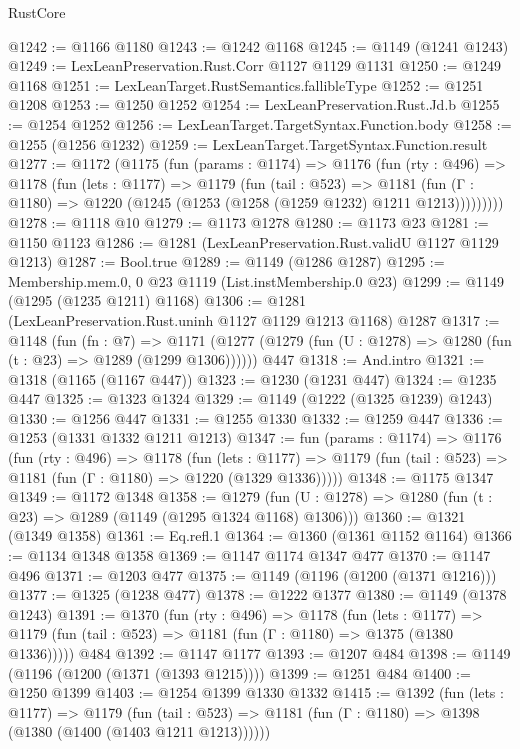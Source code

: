 \begin{lexlean}{RustCore}
\begin{coremodule}
@1242 := @1166 @1180
@1243 := @1242 @1168
@1245 := @1149 (@1241 @1243)
@1249 := LexLeanPreservation.Rust.Corr @1127 @1129 @1131
@1250 := @1249 @1168
@1251 := LexLeanTarget.RustSemantics.fallibleType
@1252 := @1251 @1208
@1253 := @1250 @1252
@1254 := LexLeanPreservation.Rust.Jd.b
@1255 := @1254 @1252
@1256 := LexLeanTarget.TargetSyntax.Function.body
@1258 := @1255 (@1256 @1232)
@1259 := LexLeanTarget.TargetSyntax.Function.result
@1277 := @1172
    (@1175
      (fun (params : @1174) =>
      @1176
        (fun (rty : @496) =>
        @1178
          (fun (lets : @1177) =>
          @1179
            (fun (tail : @523) =>
            @1181 (fun (Γ : @1180) => @1220 (@1245 (@1253 (@1258 (@1259 @1232) @1211 @1213)))))))))
@1278 := @1118 @10
@1279 := @1173 @1278
@1280 := @1173 @23
@1281 := @1150 @1123
@1286 := @1281 (LexLeanPreservation.Rust.validU @1127 @1129 @1213)
@1287 := Bool.true
@1289 := @1149 (@1286 @1287)
@1295 := Membership.mem.{0, 0} @23 @1119 (List.instMembership.{0} @23)
@1299 := @1149 (@1295 (@1235 @1211) @1168)
@1306 := @1281 (LexLeanPreservation.Rust.uninh @1127 @1129 @1213 @1168) @1287
@1317 := @1148
    (fun (fn : @7) =>
    @1171 (@1277 (@1279 (fun (U : @1278) => @1280 (fun (t : @23) => @1289 (@1299 @1306))))))
    @447
@1318 := And.intro
@1321 := @1318 (@1165 (@1167 @447))
@1323 := @1230 (@1231 @447)
@1324 := @1235 @447
@1325 := @1323 @1324
@1329 := @1149 (@1222 (@1325 @1239) @1243)
@1330 := @1256 @447
@1331 := @1255 @1330
@1332 := @1259 @447
@1336 := @1253 (@1331 @1332 @1211 @1213)
@1347 := fun (params : @1174) =>
  @1176
    (fun (rty : @496) =>
    @1178
      (fun (lets : @1177) =>
      @1179 (fun (tail : @523) => @1181 (fun (Γ : @1180) => @1220 (@1329 @1336)))))
@1348 := @1175 @1347
@1349 := @1172 @1348
@1358 := @1279 (fun (U : @1278) => @1280 (fun (t : @23) => @1289 (@1149 (@1295 @1324 @1168) @1306)))
@1360 := @1321 (@1349 @1358)
@1361 := Eq.refl.{1}
@1364 := @1360 (@1361 @1152 @1164)
@1366 := @1134 @1348 @1358
@1369 := @1147 @1174 @1347 @477
@1370 := @1147 @496
@1371 := @1203 @477
@1375 := @1149 (@1196 (@1200 (@1371 @1216)))
@1377 := @1325 (@1238 @477)
@1378 := @1222 @1377
@1380 := @1149 (@1378 @1243)
@1391 := @1370
    (fun (rty : @496) =>
    @1178
      (fun (lets : @1177) =>
      @1179 (fun (tail : @523) => @1181 (fun (Γ : @1180) => @1375 (@1380 @1336)))))
    @484
@1392 := @1147 @1177
@1393 := @1207 @484
@1398 := @1149 (@1196 (@1200 (@1371 (@1393 @1215))))
@1399 := @1251 @484
@1400 := @1250 @1399
@1403 := @1254 @1399 @1330 @1332
@1415 := @1392
    (fun (lets : @1177) =>
    @1179
      (fun (tail : @523) => @1181 (fun (Γ : @1180) => @1398 (@1380 (@1400 (@1403 @1211 @1213))))))

\end{coremodule}
\end{lexlean}
